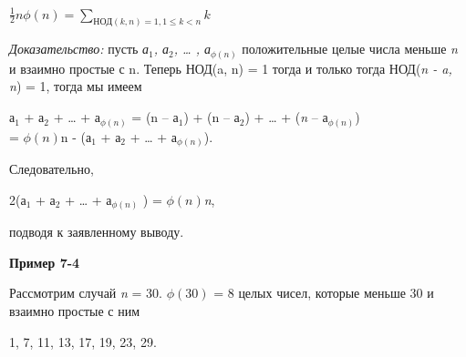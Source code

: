 \documentclass[12pt]{article}
\begin{document}
	\begin{center}
		$\frac{1}{2}n\phi(n) = 
		\sum_{НОД(k, n) = 1, 1 \leq k < n}k$	
	\end{center}
	
	
	\textit{Доказательство:} пусть \textit{ а$_1$, а$_2$, … , а$_{\phi(n)}$}  положительные целые числа меньше \textit{n} и взаимно простые с n. Теперь НОД(a, n) = 1 тогда и только тогда НОД(\textit{n - a, n}) = 1, тогда мы имеем 
	
	\begin{center}
		а$_1$  + а$_2$ +  …  + а$_{\phi(n)}$  = (n – а$_1$) + (n – а$_2$) + … + (\textit{n} – а$_{\phi(n)}$) \\
		= $\phi(n)$n - (а$_1$  + а$_2$ +  …  + а$_{\phi(n)}$).	
	\end{center}
	
	
	Следовательно, 
	
	\begin{center}
		2(а$_1$  + а$_2$ +  …  + а$_{\phi(n)}$ ) =  $\phi(n)$\textit{n},
	\end{center}
	
	
	подводя к заявленному выводу.
	
	\begin{flushleft}
		\textbf{Пример 7-4}
	\end{flushleft}

	 
	
	Рассмотрим случай \textit{n} = 30. $\phi(30)$ = 8 целых чисел, которые меньше 30 и взаимно простые с ним
	
	\begin{center}
		1, 7, 11, 13, 17, 19, 23, 29.
	\end{center}
	
\end{document}
